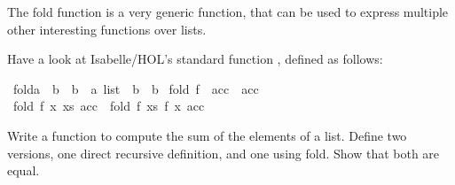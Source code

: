 %
\begin{isabellebody}%
%
%
\isadelimtheory
%
\endisadelimtheory
%
\isatagtheory
%
\endisatagtheory
{\isafoldtheory}%
%
\isadelimtheory
%
\endisadelimtheory
%
\begin{isamarkuptext}%
%
\end{isamarkuptext}\isamarkuptrue%
%
\begin{isamarkuptext}%
  The fold function is a very generic function, that can be used to express 
  multiple other interesting functions over lists.%
\end{isamarkuptext}\isamarkuptrue%
%
\begin{isamarkuptext}%
Have a look at Isabelle/HOL's standard function , defined as follows:%
\end{isamarkuptext}\isamarkuptrue%
\isamarkupfalse%
\ fold{\isacharcolon}{\kern0pt}{\isacharcolon}{\kern0pt}{\isachardoublequoteopen}{\isacharparenleft}{\kern0pt}{\isacharprime}{\kern0pt}a\ {\isasymRightarrow}\ {\isacharprime}{\kern0pt}b\ {\isasymRightarrow}\ {\isacharprime}{\kern0pt}b{\isacharparenright}{\kern0pt}\ {\isasymRightarrow}\ {\isacharprime}{\kern0pt}a\ list\ {\isasymRightarrow}\ {\isacharprime}{\kern0pt}b\ {\isasymRightarrow}\ {\isacharprime}{\kern0pt}b{\isachardoublequoteclose}\ \isanewline
{\isachardoublequoteopen}fold\ f\ {\isacharbrackleft}{\kern0pt}{\isacharbrackright}{\kern0pt}\ acc\ {\isacharequal}{\kern0pt}\ acc{\isachardoublequoteclose}\isanewline
{\isacharbar}{\kern0pt}\ {\isachardoublequoteopen}fold\ f\ {\isacharparenleft}{\kern0pt}x\ {\isacharhash}{\kern0pt}xs{\isacharparenright}{\kern0pt}\ acc\ {\isacharequal}{\kern0pt}\ fold\ f\ xs\ {\isacharparenleft}{\kern0pt}f\ x\ acc{\isacharparenright}{\kern0pt}{\isachardoublequoteclose}%
\begin{isamarkuptext}%
Write a function to compute the sum of the elements of a list. 
  Define two versions, one direct recursive definition, and one using fold.
  Show that both are equal.


\end{isamarkuptext}
\end{isabellebody}
